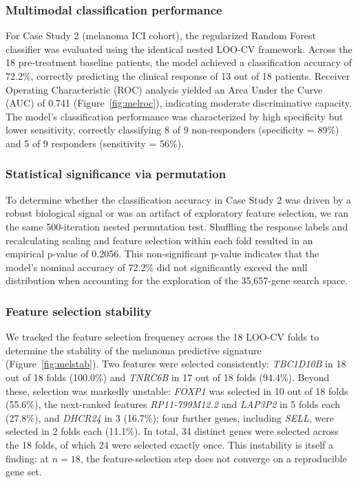 \documentclass{bmcart}
\begin{document}
\subsubsection*{Multimodal classification performance}
For Case Study 2 (melanoma ICI cohort), the regularized Random Forest classifier was evaluated using the identical nested LOO-CV framework. Across the 18 pre-treatment baseline patients, the model achieved a classification accuracy of 72.2\%, correctly predicting the clinical response of 13 out of 18 patients. Receiver Operating Characteristic (ROC) analysis yielded an Area Under the Curve (AUC) of 0.741 (Figure~\ref{fig:melroc}), indicating moderate discriminative capacity. The model's classification performance was characterized by high specificity but lower sensitivity, correctly classifying 8 of 9 non-responders (specificity = 89\%) and 5 of 9 responders (sensitivity = 56\%).

\subsubsection*{Statistical significance via permutation}
To determine whether the classification accuracy in Case Study 2 was driven by a robust biological signal or was an artifact of exploratory feature selection, we ran the same 500-iteration nested permutation test. Shuffling the response labels and recalculating scaling and feature selection within each fold resulted in an empirical p-value of 0.2056. This non-significant p-value indicates that the model's nominal accuracy of 72.2\% did not significantly exceed the null distribution when accounting for the exploration of the 35,657-gene search space.

\subsubsection*{Feature selection stability}
We tracked the feature selection frequency across the 18 LOO-CV folds to determine the stability of the melanoma predictive signature (Figure~\ref{fig:melstab}). Two features were selected consistently: \textit{TBC1D10B} in 18 out of 18 folds (100.0\%) and \textit{TNRC6B} in 17 out of 18 folds (94.4\%). Beyond these, selection was markedly unstable: \textit{FOXP1} was selected in 10 out of 18 folds (55.6\%), the next-ranked features \textit{RP11-799M12.2} and \textit{LAP3P2} in 5 folds each (27.8\%), and \textit{DHCR24} in 3 (16.7\%); four further genes, including \textit{SELL}, were selected in 2 folds each (11.1\%). In total, 34 distinct genes were selected across the 18 folds, of which 24 were selected exactly once. This instability is itself a finding: at $n=18$, the feature-selection step does not converge on a reproducible gene set.
\end{document}
